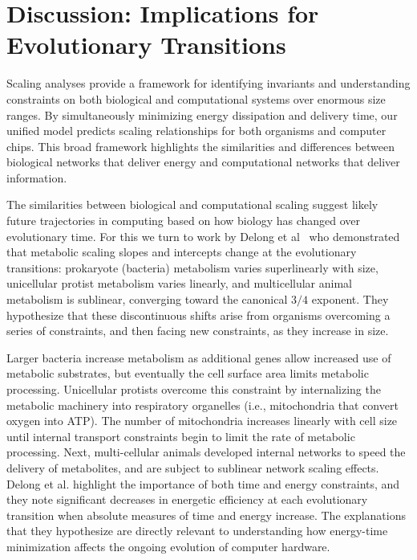 \documentclass[12pt]{article}
\begin{document}
\section{Discussion: Implications for Evolutionary Transitions}
\label{sec:discussion}

Scaling analyses provide a framework for identifying invariants and
understanding constraints on both biological and computational systems over
enormous size ranges.  By simultaneously minimizing energy dissipation and delivery
time, our unified model 
predicts scaling relationships for both
organisms and computer chips.  This broad framework highlights the similarities
and differences between biological networks that deliver energy and
computational networks that deliver information. 

The similarities between biological and computational scaling
suggest likely future trajectories in computing based on how biology
has changed over evolutionary time. For this we turn to work by Delong et al~\cite{delong2010shifts} who
demonstrated that metabolic scaling slopes and intercepts change at the
evolutionary transitions: prokaryote (bacteria) metabolism varies superlinearly with
size, unicellular protist metabolism varies linearly, and multicellular animal
metabolism is sublinear, converging toward the canonical $3/4$ exponent. They
hypothesize that these discontinuous shifts arise from organisms overcoming a series of
constraints, and then facing new constraints, as they increase in size.

Larger bacteria increase metabolism as additional genes allow increased use of
metabolic substrates, but eventually the cell surface area limits metabolic
processing. Unicellular protists overcome this constraint by internalizing the metabolic machinery into
respiratory organelles (i.e., mitochondria that convert oxygen into ATP). The
number of mitochondria increases linearly with cell size until internal
transport constraints begin to limit the rate of metabolic processing.
Next, multi-cellular
animals developed internal networks to speed the delivery of metabolites,
and are subject to sublinear network scaling effects. Delong et al. highlight the
importance of both time and energy constraints, and they note significant decreases in energetic
efficiency at each evolutionary transition when absolute measures of time and
energy increase.  The explanations that they hypothesize are directly relevant
to understanding how energy-time minimization affects the ongoing evolution of
computer hardware.
\end{document}
